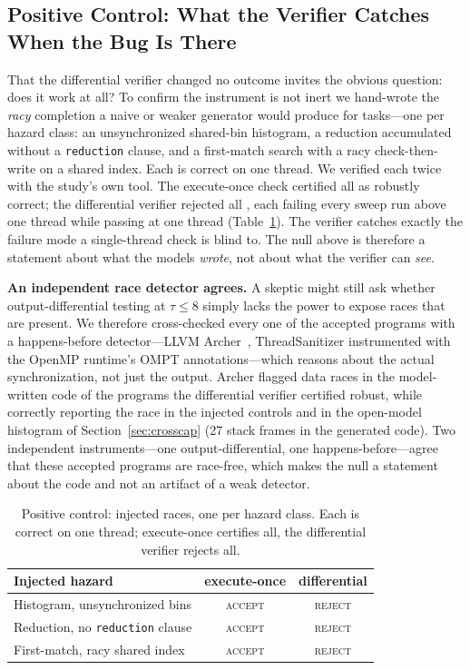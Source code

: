 \subsection{Positive Control: What the Verifier Catches When the Bug Is There}
\label{sec:control}
That the differential verifier changed no outcome invites the obvious question:
does it work at all? To confirm the instrument is not inert we hand-wrote the
\emph{racy} completion a naive or weaker generator would produce for \Ninjected{}
tasks---one per hazard class: an unsynchronized shared-bin histogram, a reduction
accumulated without a \texttt{reduction} clause, and a first-match search with a
racy check-then-write on a shared index. Each is correct on one thread. We verified
each twice with the study's own tool. The execute-once check certified all
\Ninjected{} as robustly correct; the differential verifier rejected all
\NinjectedCaught{}, each failing every sweep run above one thread while passing at
one thread (Table~\ref{tab:injected}). The verifier catches exactly the failure mode a
single-thread check is blind to. The null above is therefore a statement about what
the models \emph{wrote}, not about what the verifier can \emph{see}.

\vspace{2pt}
\noindent\textbf{An independent race detector agrees.} A skeptic might still ask
whether output-differential testing at $\tau\!\le\!8$ simply lacks the power to
expose races that are present. We therefore cross-checked every one of the
\NsanTimed{} accepted programs with a happens-before detector---LLVM
Archer~\cite{archer,sword}, ThreadSanitizer instrumented with the OpenMP runtime's
OMPT annotations---which reasons about the actual synchronization, not just the
output. Archer flagged \NsanRaces{} data races in the model-written code of the
\NsanTimed{} programs the differential verifier certified robust, while correctly
reporting the race in the injected controls and in the open-model histogram of
Section~\ref{sec:crosscap} (27 stack frames in the generated code). Two independent
instruments---one output-differential, one happens-before---agree that these
accepted programs are race-free, which makes the null a statement about the code and
not an artifact of a weak detector.

\begin{table}[t]
\caption{Positive control: injected races, one per hazard class. Each is correct on
one thread; execute-once certifies all, the differential verifier rejects all.}
\label{tab:injected}
\centering\footnotesize
\begin{tabular}{@{}lcc@{}}
\toprule
Injected hazard & execute-once & differential \\
\midrule
Histogram, unsynchronized bins           & \textsc{accept} & \textsc{reject} \\
Reduction, no \texttt{reduction} clause  & \textsc{accept} & \textsc{reject} \\
First-match, racy shared index           & \textsc{accept} & \textsc{reject} \\
\bottomrule
\end{tabular}
\end{table}

